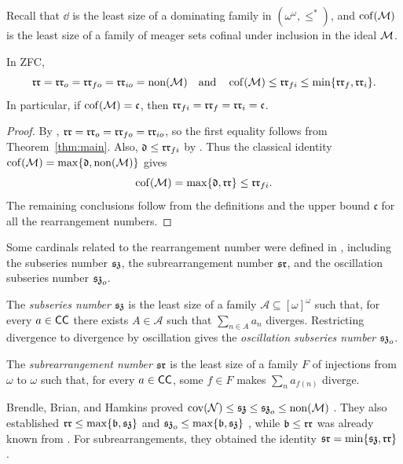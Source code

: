 Recall that $\dd$ is the least size of a dominating family in
$(\omega^\omega,\leq^*)$, and $\operatorname{cof}(\mathcal M)$ is the least size of a family
of meager sets cofinal under inclusion in the ideal $\mathcal M$.

\begin{corollary}\label{cor:rr-variants}
In ZFC,
\[
 \mathfrak{rr}=\mathfrak{rr}_{o}=\mathfrak{rr}_{fo}=\mathfrak{rr}_{io}=\operatorname{non}(\mathcal M)
 \quad\text{and}\quad
 \operatorname{cof}(\mathcal M)\leq\mathfrak{rr}_{fi}\leq\min\{\mathfrak{rr}_{f},\mathfrak{rr}_{i}\}.
\]
In particular, if $\operatorname{cof}(\mathcal M)=\mathfrak c$, then
$\mathfrak{rr}_{fi}=\mathfrak{rr}_{f}=\mathfrak{rr}_{i}=\mathfrak c$.
\end{corollary}

\begin{proof}
By \cite[Theorem~5]{BBBHHL}, $\mathfrak{rr}=\mathfrak{rr}_{o}=\mathfrak{rr}_{fo}=\mathfrak{rr}_{io}$, so the first
equality follows from Theorem~\ref{thm:main}. Also,
$\mathfrak d\leq\mathfrak{rr}_{fi}$ by \cite[Theorem~12]{BBBHHL}. Thus the classical
identity $\operatorname{cof}(\mathcal M)=\max\{\mathfrak d,\operatorname{non}(\mathcal M)\}$
\cite[Theorem~5.6]{BlassHandbook} gives
\[
 \operatorname{cof}(\mathcal M)=\max\{\mathfrak d,\mathfrak{rr}\}\leq\mathfrak{rr}_{fi}.
\]
The remaining conclusions follow from the definitions and the upper
bound $\mathfrak c$ for all the rearrangement numbers.
\end{proof}

Some cardinals related to the rearrangement number were defined
in \cite{BrendleBrianHamkins}, including the subseries number $\mathfrak{sz}$,
the subrearrangement number $\mathfrak{sr}$, and the oscillation subseries number $\mathfrak{sz}_o$.

\begin{definition}\label{def:subseries}
The \emph{subseries number} $\mathfrak{sz}$ is the least size of a family
$\mathcal A\subseteq[\omega]^\omega$ such that, for every $a\in\mathsf{CC}$ there exists $A\in\mathcal A$ such that $\sum_{n\in A}a_n$ diverges.
Restricting divergence to divergence by oscillation gives the \emph{oscillation subseries number} $\mathfrak{sz}_o$.

The \emph{subrearrangement number} $\mathfrak{sr}$ is the least size of a
family $F$ of injections from $\omega$ to $\omega$ such that, for
every $a\in\mathsf{CC}$, some $f\in F$ makes $\sum_n a_{f(n)}$ diverge.
\end{definition}

Brendle, Brian, and Hamkins proved
$\operatorname{cov}(\mathcal N)\leq\mathfrak{sz}\leq\mathfrak{sz}_o\leq\operatorname{non}(\mathcal M)$
\cite[Theorems~4, 11, and~13]{BrendleBrianHamkins}.
They also established $\mathfrak{rr}\leq\max\{\mathfrak b,\mathfrak{sz}\}$ and
$\mathfrak{sz}_o\leq\max\{\mathfrak b,\mathfrak{sz}\}$
\cite[Theorems~19(1) and~21]{BrendleBrianHamkins}, while
$\mathfrak b\leq\mathfrak{rr}$ was already known from \cite[Theorem~11]{BBBHHL}.
For subrearrangements, they obtained the identity
$\mathfrak{sr}=\min\{\mathfrak{sz},\mathfrak{rr}\}$
\cite[Theorem~35]{BrendleBrianHamkins}.

